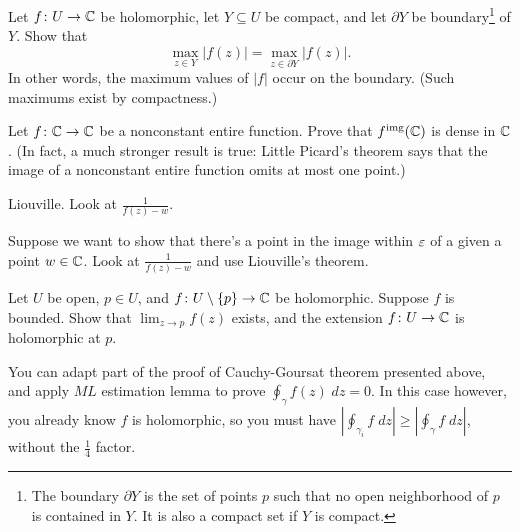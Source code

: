 
\begin{dproblem}
	Let $f \colon U \to \mathbb C$ be holomorphic, let $Y \subseteq U$ be compact,
	and let $\partial Y$ be boundary\footnote{The boundary $\partial Y$
		is the set of points $p$
		such that no open neighborhood of $p$ is contained in $Y$.
		It is also a compact set if $Y$ is compact.
	} of $Y$.
	Show that
	\[ \max_{z \in Y} \left\lvert f(z) \right\rvert
		= \max_{z \in \partial Y} \left\lvert f(z) \right\rvert. \]
	In other words, the maximum values of $\left\lvert f \right\rvert$ occur
	on the boundary. (Such maximums exist by compactness.)
\end{dproblem}

\begin{problem}
	Let $f \colon \mathbb C \to \mathbb C$ be a nonconstant entire function.
	Prove that $f^{\text{img}}(\mathbb C)$ is dense in $\mathbb C$.
	(In fact, a much stronger result is true:
	Little Picard's theorem says that the image of a nonconstant
	entire function omits at most one point.)
	\begin{hint}
		Liouville. Look at $\frac{1}{f(z)-w}$.
	\end{hint}
	\begin{sol}
		Suppose we want to show that there's a point
		in the image within $\varepsilon$ of a given a point $w \in \mathbb C$.
		Look at $\frac{1}{f(z) - w}$ and use Liouville's theorem.
	\end{sol}
\end{problem}

\begin{problem}
	Let $U$ be open, $p \in U$, and $f \colon U \setminus \{p\} \to \mathbb C$ be holomorphic.
	Suppose $f$ is bounded. Show that $\lim_{z \to p} f(z)$ exists, and the extension
	$f \colon U \to \mathbb C$ is holomorphic at $p$.
	\begin{hint}
		You can adapt part of the proof of Cauchy-Goursat theorem presented above,
		and apply $ML$ estimation lemma to prove $\oint_\gamma f(z) \; dz = 0$.
		In this case however, you already know $f$ is holomorphic, so you must have
		$|\oint_{\gamma_i} f \; dz| \geq |\oint_\gamma f \; dz|$, without the $\frac{1}{4}$ factor.
	\end{hint}
\end{problem}

